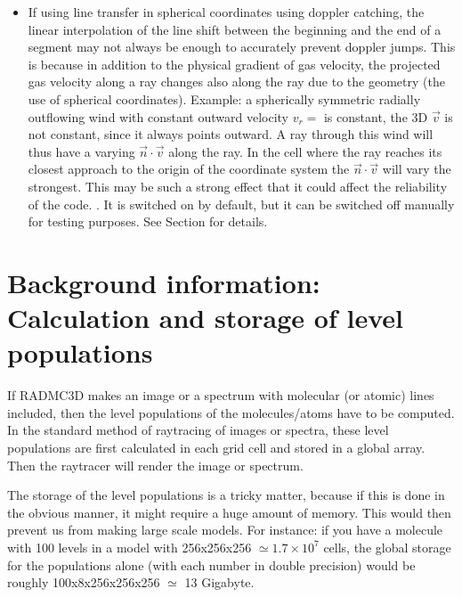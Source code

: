 \documentclass[letterpaper,10pt,english]{sphinxmanual}
\begin{document}
\begin{itemize}
\item {} 
If using line transfer in spherical coordinates using doppler
catching, the linear interpolation of the line shift between the beginning
and the end of a segment may not always be enough to accurately prevent
doppler jumps. This is because in addition to the physical gradient of gas
velocity, the projected gas velocity along a ray changes also along the
ray due to the geometry (the use of spherical coordinates). Example: a
spherically symmetric radially outflowing wind with constant outward
velocity \(v_r=\) is constant, the 3\sphinxhyphen{}D 
\(\vec v\) is not constant, since it always points outward. A ray through
this wind will thus have a varying \(\vec n\cdot \vec v\) along the ray.  In
the cell where the ray reaches its closest approach to the origin of the
coordinate system the \(\vec n\cdot \vec v\) will vary the strongest.  This
may be such a strong effect that it could affect the reliability of the
code. . It is switched on by default, but it can be switched off manually
for testing purposes. See Section {\hyperref[\detokenize{imagesspectra:sec-secord-spher}]{}} for details.

\end{itemize}


\section{Background information: Calculation and storage of level populations}
\label{\detokenize{lineradtrans:background-information-calculation-and-storage-of-level-populations}}\label{\detokenize{lineradtrans:sec-calcstore-levpop}}
If RADMC\sphinxhyphen{}3D makes an image or a spectrum with molecular (or atomic) lines
included, then the level populations of the molecules/atoms have to be
computed. In the standard method of ray\sphinxhyphen{}tracing of images or spectra, these
level populations are first calculated in each grid cell and stored in a global
array. Then the raytracer will render the image or spectrum.

The storage of the level populations is a tricky matter, because if this is done
in the obvious manner, it might require a huge amount of memory. This would then
prevent us from making large scale models. For instance: if you have a molecule
with 100 levels in a model with 256x256x256 \(\simeq 1.7\times 10^7\) cells,
the global storage for the populations alone (with each number in double
precision) would be roughly 100x8x256x256x256 \(\simeq\) 13 Gigabyte.
\end{document}
